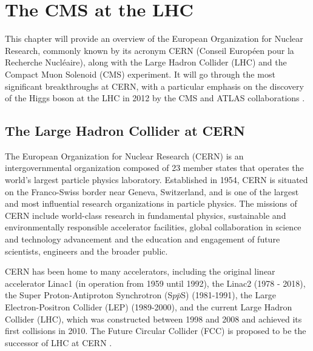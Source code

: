 \chapter[The CMS at the LHC]{The CMS at the LHC}

This chapter will provide an overview of the European Organization for Nuclear Research, commonly known by its acronym CERN (Conseil Européen pour la Recherche Nucléaire), along with the Large Hadron Collider (LHC) and the Compact Muon Solenoid (CMS) experiment. It will go through the most significant breakthroughs at CERN, with a particular emphasis on the discovery of the Higgs boson at the LHC in 2012 by the CMS and ATLAS collaborations \cite{CMS:2012qbp,ATLAS:2012yve}.

\section{The Large Hadron Collider at CERN}

The European Organization for Nuclear Research (CERN) is an intergovernmental organization composed of 23 member states that operates the world's largest particle physics laboratory. Established in 1954, CERN is situated on the Franco-Swiss border near Geneva, Switzerland, and is one of the largest and most influential research organizations in particle physics. The missions of CERN include world-class research in fundamental physics, sustainable and environmentally responsible accelerator facilities, global collaboration in science and technology advancement and the education and engagement of future scientists, engineers and the broader public.

CERN has been home to many accelerators, including the original linear accelerator Linac1 (in operation from 1959 until 1992), the Linac2 (1978 - 2018), the Super Proton-Antiproton Synchrotron (S$p\bar{p}$S) (1981-1991), the Large Electron-Positron Collider (LEP) (1989-2000), and the current Large Hadron Collider (LHC), which was constructed between 1998 and 2008 and achieved its first collisions in 2010. The Future Circular Collider (FCC) is proposed to be the successor of LHC at CERN \cite{FCC:2018byv}.

